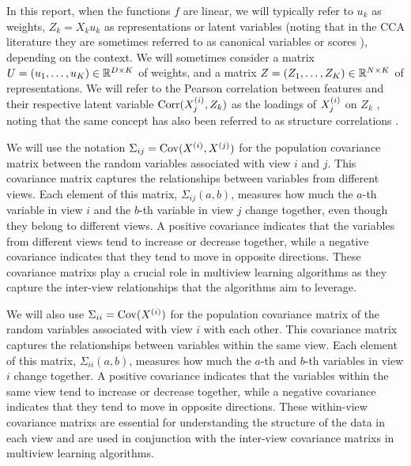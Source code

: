 In this report, when the functions $f$ are linear, we will typically refer to $u_k$ as \gls{weights}, $Z_k = X_k u_k$ as \gls{representations} or \gls{latent variables} (noting that in the CCA literature they are sometimes referred to as canonical variables \citep{borga_learning_1998} or scores \citep{mihalik2022canonical}), depending on the context.
We will sometimes consider a matrix $U = \left(u_1, \dots, u_K\right) \in \mathbb{R}^{D \times K}$ of \gls{weights}, and a matrix $Z = \left(Z_1, \dots, Z_K\right) \in \mathbb{R}^{N \times K}$ of representations.
We will refer to the Pearson correlation between features and their respective latent variable $\operatorname{Corr}(X^{(i)}_j, Z_k)$ as the \gls{loadings} of $X^{(i)}_j$ on $Z_k$ \citep{rosipal2005overview, alpert1972interpretation, borga_learning_1998}, noting that the same concept has also been referred to as structure correlations \citep{meredith1964canonical}.

We will use the notation $\Sigma_{ij}=\mathrm{Cov}(X^{(i)}, X^{(j)})$ for the population \gls{covariance matrix} between the random variables associated with view $i$ and $j$. This \gls{covariance matrix} captures the relationships between variables from different views. Each element of this matrix, $\Sigma_{ij}(a,b)$, measures how much the $a$-th variable in view $i$ and the $b$-th variable in view $j$ change together, even though they belong to different views. A positive covariance indicates that the variables from different views tend to increase or decrease together, while a negative covariance indicates that they tend to move in opposite directions. These \glspl{covariance matrix} play a crucial role in multiview learning algorithms as they capture the inter-view relationships that the algorithms aim to leverage.

We will also use $\Sigma_{ii}= \mathrm{Cov}(X^{(i)})$ for the population \gls{covariance matrix} of the random variables associated with view $i$ with each other. This \gls{covariance matrix} captures the relationships between variables within the same view. Each element of this matrix, $\Sigma_{ii}(a,b)$, measures how much the $a$-th and $b$-th variables in view $i$ change together. A positive covariance indicates that the variables within the same view tend to increase or decrease together, while a negative covariance indicates that they tend to move in opposite directions. These within-view \glspl{covariance matrix} are essential for understanding the structure of the data in each view and are used in conjunction with the inter-view \glspl{covariance matrix} in multiview learning algorithms.

